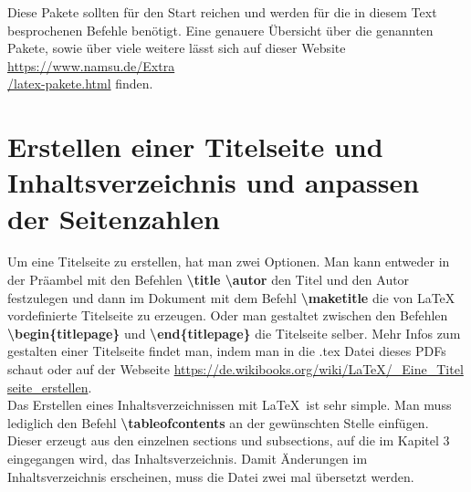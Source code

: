 \documentclass[a4paper, 12pt]{scrreprt}
\begin{document}
Diese Pakete sollten für den Start reichen und werden für die in diesem Text besprochenen Befehle benötigt. Eine genauere Übersicht über die genannten Pakete, sowie über viele weitere lässt sich auf dieser Website  \href{https://www.namsu.de/Extra/latex-pakete.html}{https://www.namsu.de/Extra\\/latex-pakete.html} finden.

\section{Erstellen einer Titelseite und Inhaltsverzeichnis und anpassen der Seitenzahlen}
\hspace*{0.5cm}Um eine Titelseite zu erstellen, hat man zwei Optionen. Man kann entweder in der Präambel mit den Befehlen \textbf{\textbackslash title \textbackslash autor} den Titel und den Autor festzulegen und dann im Dokument mit dem Befehl \textbf{\textbackslash maketitle} die von \LaTeX\, vordefinierte Titelseite zu erzeugen. Oder man gestaltet zwischen den Befehlen \textbf{\textbackslash begin\{titlepage\}} und \textbf{\textbackslash end\{titlepage\}} die Titelseite selber. Mehr Infos zum gestalten einer Titelseite findet man, indem man in die .tex Datei dieses PDFs schaut oder auf der Webseite \href{https://de.wikibooks.org/wiki/LaTeX/_Eine_Titelseite_erstellen}{https://de.wikibooks.org/wiki/LaTeX/\_Eine\_Titel\\seite\_erstellen}.\\

Das Erstellen eines Inhaltsverzeichnissen mit \LaTeX\, ist sehr simple. Man muss lediglich den Befehl \textbf{\textbackslash tableofcontents} an der gewünschten Stelle einfügen. Dieser erzeugt aus den einzelnen sections und subsections, auf die im Kapitel 3 eingegangen wird, das Inhaltsverzeichnis. Damit Änderungen im Inhaltsverzeichnis erscheinen, muss die Datei zwei mal übersetzt werden.\\
\end{document}
